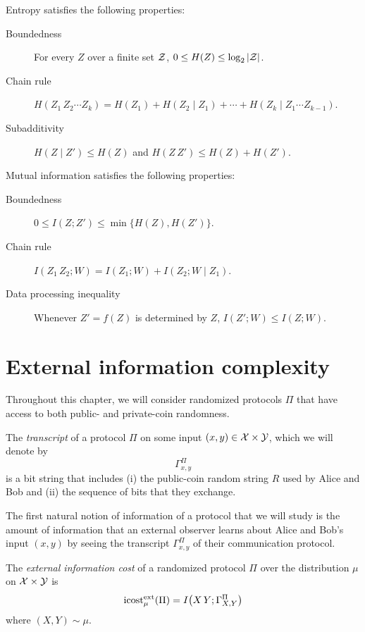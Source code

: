 \begin{theorem}
Entropy satisfies the following properties:
\begin{description}
\item[Boundedness] For every $Z$ over a finite set $\mathcal{Z}$, $0 \le H(Z) \le \log_2 |\mathcal{Z}|$.
\item[Chain rule] $H(Z_1\,Z_2\cdots Z_k) = H(Z_1) + H(Z_2 \mid Z_1) + \cdots + H(Z_k \mid Z_1\cdots Z_{k-1})$.
\item[Subadditivity] $H(Z \mid Z') \le H(Z)$ and $H(Z\,Z') \le H(Z) + H(Z')$.
\end{description}
Mutual information satisfies the following properties:
\begin{description}
\item[Boundedness] $0 \le I(Z ; Z') \le \min\{ H(Z), H(Z') \}$.
\item[Chain rule] $I(Z_1\,Z_2 ; W) = I(Z_1 ; W) + I(Z_2 ; W \mid Z_1)$.
\item[Data processing inequality] Whenever $Z' = f(Z)$ is determined by $Z$, $I(Z' ; W) \le I(Z ; W)$.
\end{description}

\end{theorem}



\newpage 
\section{External information complexity}

Throughout this chapter, we will consider randomized protocols $\Pi$ that have access to both public- and private-coin randomness. 

\begin{definition}[Transcript]
The \emph{transcript} of a protocol $\Pi$ on some input $(x,y) \in \mathcal{X} \times \mathcal{Y}$, which we will denote by
\[
\Gamma_{x,y}^\Pi
\]
is a bit string that includes (i) the public-coin random string $R$ used by Alice and Bob and (ii) the sequence of bits that they exchange. 
\end{definition}

The first natural notion of information of a protocol that we will study is the amount of information that an external observer learns about Alice and Bob's input $(x,y)$ by seeing the transcript $\Gamma_{x,y}^\Pi$ of their communication protocol.

\begin{definition}
The \emph{external information cost} of a randomized protocol $\Pi$ over the distribution $\mu$ on $\mathcal{X} \times \mathcal{Y}$ is
\[
\mathrm{icost}^{\mathrm{ext}}_\mu(\Pi) = I\big( X\,Y ; \Gamma_{X,Y}^\Pi \big)
\]
where $(X,Y) \sim \mu$.
\end{definition}

